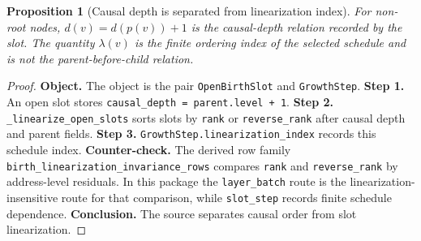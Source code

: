 \documentclass[11pt]{article}
\newtheorem{proposition}[definition]{Proposition}
\theoremstyle{remark}
\newcommand{\code}[1]{\texttt{#1}}
\numberwithin{equation}{section}
\begin{document}
\begin{proposition}[Causal depth is separated from linearization index]
For non-root nodes, \(d(v)=d(p(v))+1\) is the causal-depth relation recorded by the slot. The quantity \(\lambda(v)\) is the finite ordering index of the selected schedule and is not the parent-before-child relation.
\end{proposition}
\begin{proof}
\textbf{Object.} The object is the pair \code{OpenBirthSlot} and \code{GrowthStep}. \textbf{Step 1.} An open slot stores \code{causal\_\allowbreak{}depth = parent.level + 1}. \textbf{Step 2.} \code{\_linearize\_\allowbreak{}open\_\allowbreak{}slots} sorts slots by \code{rank} or \code{reverse\_\allowbreak{}rank} after causal depth and parent fields. \textbf{Step 3.} \code{GrowthStep.linearization\_\allowbreak{}index} records this schedule index. \textbf{Counter-check.} The derived row family \code{birth\_\allowbreak{}linearization\_\allowbreak{}invariance\_\allowbreak{}rows} compares \code{rank} and \code{reverse\_\allowbreak{}rank} by address-level residuals. In this package the \code{layer\_\allowbreak{}batch} route is the linearization-insensitive route for that comparison, while \code{slot\_\allowbreak{}step} records finite schedule dependence. \textbf{Conclusion.} The source separates causal order from slot linearization.
\end{proof}
\end{document}
